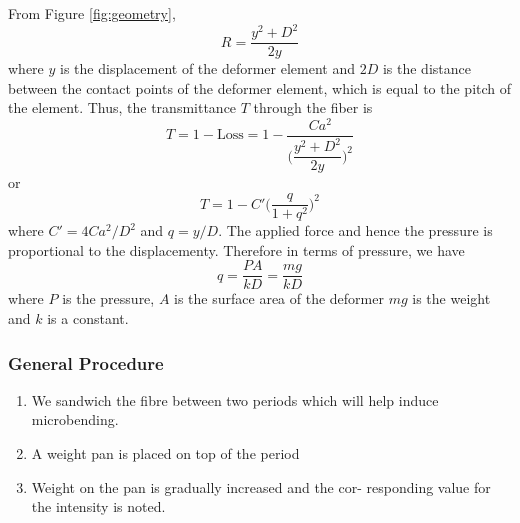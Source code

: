 \documentclass[%
 reprint,
nofootinbib,
 amsmath,amssymb,
 aps,
]{revtex4-2}
\begin{document}
From Figure \ref{fig:geometry}, 
\begin{equation}\label{key}
	R = \dfrac{y^2 + D^2}{2y}
\end{equation}
where $ y $ is the displacement of the deformer element and $ 2D $ is the distance between the
contact points of the deformer element, which is equal to the pitch of the element. Thus,
the transmittance $ T $ through the fiber is
\begin{equation}\label{key}
	T = 1 - \textrm{Loss} = 1 - \dfrac{Ca^2}{\Bigg(\dfrac{y^2 + D^2}{2y}\Bigg)^2}
\end{equation}
or
\begin{equation}\label{eq:microbending}
	T = 1 - C' \Bigg(\dfrac{q}{1+q^2}\Bigg)^2
\end{equation}
where $ C' = 4Ca^2/D^2 $ and $ q = y/D $. The applied force and hence the pressure is proportional to the displacementy. Therefore
in terms of pressure, we have
\begin{equation}\label{key}
	q = \dfrac{PA}{kD} = \dfrac{mg}{kD}
\end{equation}
where $ P $ is the pressure, $ A $ is the surface area of the deformer $ mg $ is the weight and $ k $ is a constant. 
\subsubsection*{\textbf{General Procedure}}
\begin{enumerate}
	\item We sandwich the fibre between two periods which will
	help induce microbending.
	\item A weight pan is placed on top of the period
	\item Weight on the pan is gradually increased and the cor-
	responding value for the intensity is noted.
\end{enumerate}
\end{document}
